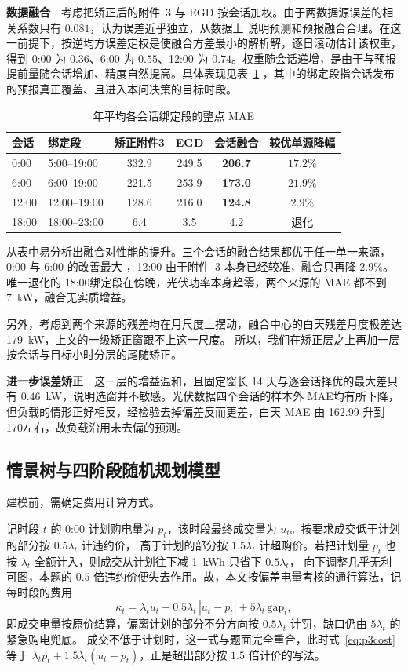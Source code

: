 \documentclass[zihao=-4,a4paper,fontset=none]{ctexart}
\begin{document}
\textbf{数据融合}\ \ 考虑把矫正后的附件~3 与 EGD 按会话加权。由于两数据源误差的相关系数只有 $0.081$，认为误差近乎独立，从数据上
说明预测和预报融合合理。在这一前提下，按逆均方误差定权是使融合方差最小的解析解，逐日滚动估计该权重，
得到 0:00 为 $0.36$、6:00 为 $0.55$、12:00 为 $0.74$。权重随会话递增，是由于与预报提前量随会话增加、精度自然提高。具体表现见表~\ref{tab:p3fc}
，其中的绑定段指会话发布的预报真正覆盖、且进入本问决策的目标时段。

\begin{table}[htbp]
\centering
\caption{年平均各会话绑定段的整点 MAE}
{\small
\begin{tabular}{llcccc}
\toprule
会话 & 绑定段 & 矫正附件3 & EGD & 会话融合 & 较优单源降幅 \\
\midrule
0:00 & 5:00--19:00 & 332.9 & 249.5 & \textbf{206.7} & $17.2\%$ \\
6:00 & 6:00--19:00 & 221.5 & 253.9 & \textbf{173.0} & $21.9\%$ \\
12:00 & 12:00--19:00 & 128.6 & 216.0 & \textbf{124.8} & $2.9\%$ \\
18:00 & 18:00--23:00 & 6.4 & 3.5 & 4.2 & 退化 \\
\bottomrule
\end{tabular}}
\label{tab:p3fc}
\end{table}

从表中易分析出融合对性能的提升。三个会话的融合结果都优于任一单一来源，0:00 与 6:00 的改善最大
，12:00 由于附件~3 本身已经较准，融合只再降 $2.9\%$。唯一退化的 18:00绑定段在傍晚，光伏功率本身趋零，两个来源的 MAE 都不到 7~kW，融合无实质增益。

另外，考虑到两个来源的残差均在月尺度上摆动，融合中心的白天残差月度极差达 179~kW，上文的一级矫正窗跟不上这一尺度。
所以，我们在矫正层之上再加一层按会话与目标小时分层的尾随矫正。

\textbf{进一步误差矫正}\ \ 这一层的增益温和，且固定窗长 14 天与逐会话择优的最大差只有 $0.46$~kW，说明选窗并不敏感。光伏数据四个会话的样本外 MAE均有所下降，
但负载的情形正好相反，经检验去掉偏差反而更差，白天 MAE 由 162.99 升到 170左右，故负载沿用未去偏的预测。


\subsection{情景树与四阶段随机规划模型}
\label{sub:p3model}

建模前，需确定费用计算方式。

记时段 $t$ 的 0:00 计划购电量为 $p_t$，该时段最终成交量为 $u_t$。按要求成交低于计划的部分按 $0.5\lambda_t$ 计违约价，
高于计划的部分按 $1.5\lambda_t$ 计超购价。若把计划量 $p_t$ 也按 $\lambda_t$ 全额计入，则成交从计划往下减 1~kWh 只省下 $0.5\lambda_t$，
向下调整几乎无利可图，本题的 $0.5$ 倍违约价便失去作用。故，本文按偏差电量考核的通行算法，记每时段的费用
\begin{equation}
\kappa_t=\lambda_t u_t+0.5\lambda_t\,|u_t-p_t|+5\lambda_t\,\mathrm{gap}_t ,
\label{eq:p3cost}
\end{equation}
即成交电量按原价结算，偏离计划的部分不分方向按 $0.5\lambda_t$ 计罚，缺口仍由 $5\lambda_t$ 的紧急购电兜底。
成交不低于计划时，这一式与题面完全重合，此时式~\eqref{eq:p3cost} 等于 $\lambda_t p_t+1.5\lambda_t(u_t-p_t)$，正是超出部分按 $1.5$ 倍计价的写法。
\end{document}

